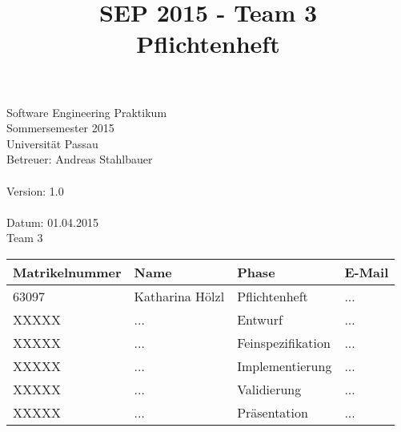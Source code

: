 \documentclass[a4paper]{scrreprt}
\begin{document}
	\thispagestyle{plain}

\begin{titlepage}
    \begin{center}

    	\begin{title}
        	\title{\Huge{\textbf{SEP 2015 - Team 3 \\ Pflichtenheft\\}}}

		\end{title}
		\hspace{3cm}

        	Software Engineering Praktikum \\
        	Sommersemester 2015\\
        	Universität Passau\\


        	Betreuer: Andreas Stahlbauer \\
        	\hspace{1,5cm}\\
        	Version: 1.0 \\
        	\hspace{1,5cm}\\
        	Datum: 01.04.2015\\[50pt]
        	Team 3 \\
    
        
        \begin{tabular}{ | l | l | l | l |}
            \hline
            \textbf{Matrikelnummer} & \textbf{Name} & \textbf{Phase} & \textbf{E-Mail}  \\ \hline
            63097 & Katharina Hölzl & Pflichtenheft & ... \\ \hline
            XXXXX & ... & Entwurf & ...  \\ \hline
            XXXXX & ... & Feinspezifikation  & ... \\ \hline
            XXXXX & ... & Implementierung  &  ... \\ \hline
            XXXXX & ... & Validierung & ... \\ \hline  
            XXXXX & ... &  Präsentation & ... \\ \hline
        \end{tabular}
    \end{center}
\end{titlepage}
 
 

\tableofcontents
 
\printglossaries
\end{document}
